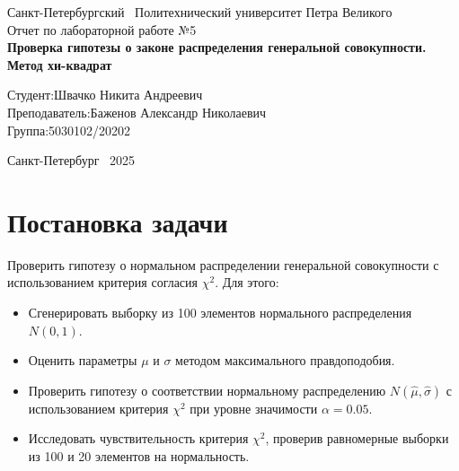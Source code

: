 \documentclass[a4paper]{article}
\begin{document}
    \begin{titlepage}
        \Large
        \begin{center}
            Санкт-Петербургский \ Политехнический университет Петра Великого\\
            \vspace{10em}Отчет по лабораторной работе №5\\
            \vspace{2em}
            \textbf{Проверка гипотезы о законе распределения генеральной совокупности. Метод хи-квадрат}
        \end{center}
        \vspace{6em}
        \hfill\parbox{10cm}{
            \hspace*{2cm}\hspace*{-4cm}Студент:\hfill Швачко Никита Андреевич\\
            \hspace*{2cm}\hspace*{-4cm}Преподаватель:\hfill Баженов Александр Николаевич\\
            \hspace*{2cm}\hspace*{-4cm}Группа:\hfill 5030102/20202
        }
        \vspace{\fill}
        \begin{center}
            Санкт-Петербург \ 2025
        \end{center}
    \end{titlepage}


    \section{Постановка задачи}
    Проверить гипотезу о нормальном распределении генеральной совокупности с использованием критерия согласия $\chi^2$.
    Для этого:
    \begin{itemize}
        \item Сгенерировать выборку из 100 элементов нормального распределения $N(0, 1)$.
        \item Оценить параметры $\mu$ и $\sigma$ методом максимального правдоподобия.
        \item Проверить гипотезу о соответствии нормальному распределению $N(\hat{\mu}, \hat{\sigma})$ с использованием
        критерия $\chi^2$ при уровне значимости $\alpha = 0.05$.
        \item Исследовать чувствительность критерия $\chi^2$, проверив равномерные выборки из 100 и 20 элементов на нормальность.
    \end{itemize}
\end{document}
